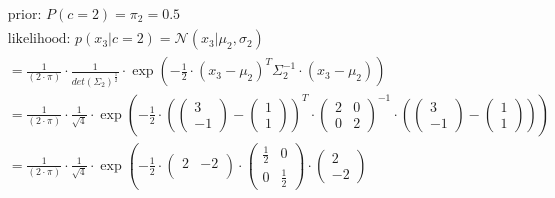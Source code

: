 \documentclass[12pt]{article}
\begin{document}
\begin{enumerate}
\begin{itemize}[label=]
            \begin{equation*}
                \begin{aligned}
                    &\text{prior: } P(c=2) = \pi_2 = \mathbf{0.5} \\
                    &\text{likelihood: } p(x_3|c=2) = \mathcal{N}(x_3| \mu_2, \sigma_2) \\
                    &= \frac{1}{(2 \cdot \pi)} \cdot \frac{1}{det(\Sigma_2)^\frac{1}{2}} \cdot \exp \left( -\frac{1}{2} \cdot (x_3 - \mu_2)^{T} \Sigma_2^{-1} \cdot (x_3 - \mu_2) \right)\\
                    &= \frac{1}{(2 \cdot \pi)} \cdot \frac{1}{\sqrt{4}} \cdot \exp \left( -\frac{1}{2} \cdot \left(\begin{pmatrix}
                    3\\
                    -1
                    \end{pmatrix} - \begin{pmatrix}
                    1\\
                    1
                    \end{pmatrix}\right)^{T} \cdot \begin{pmatrix}
                    2 & 0\\
                    0 & 2
                    \end{pmatrix}^{-1} \cdot \left(\begin{pmatrix}
                    3\\
                    -1
                    \end{pmatrix} - \begin{pmatrix}
                    1\\
                    1
                    \end{pmatrix}\right) \right)\\
                    &= \frac{1}{(2 \cdot \pi)} \cdot \frac{1}{\sqrt{4}} \cdot \exp \left( -\frac{1}{2} \cdot \begin{pmatrix}
                    2 & -2\\
                    \end{pmatrix} \cdot \begin{pmatrix}
                    \frac{1}{2} & 0\\
                    0 & \frac{1}{2}
                    \end{pmatrix} \cdot \begin{pmatrix}
                    2\\
                    -2

\end{pmatrix}
\end{aligned}
\end{equation*}
\end{itemize}
\end{enumerate}
\end{document}

